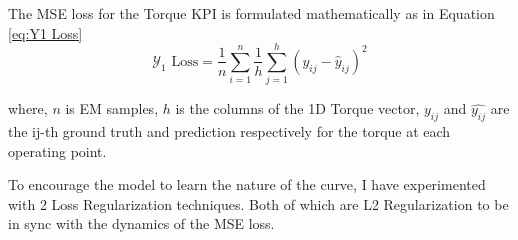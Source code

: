 \documentclass{report} %
\begin{document}
The \ac{MSE} loss for the Torque \ac{KPI} is formulated mathematically as in Equation \ref{eq:Y1 Loss}
\begin{equation}
    \text{$\mathcal{Y}_1$ Loss} = \frac{1}{n} \sum_{i=1}^{n} \frac{1}{h} \sum_{j=1}^{h} (y_{ij} - \hat{y}_{ij})^2
    \label{eq:Y1 Loss}
\end{equation} 

where, \(n\) is \ac{EM} samples, \(h\) is the columns of the 1D Torque vector, \(y_{ij}\) and $\hat{y_{ij}}$ are the ij-th ground truth and prediction respectively for 
the torque at each operating point.

To encourage the model to learn the nature of the curve, I have experimented with 2 Loss Regularization techniques. 
Both of which are L2 Regularization to be in sync with the dynamics of the \ac{MSE} loss.
\end{document}
